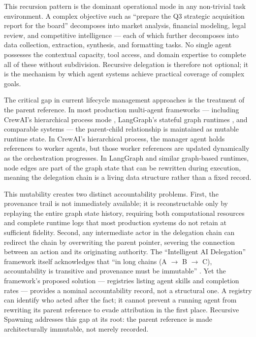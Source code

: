 This recursion pattern is the dominant operational mode in any non-trivial task environment.  A complex objective such as ``prepare the Q3 strategic acquisition report for the board'' decomposes into market analysis, financial modeling, legal review, and competitive intelligence --- each of which further decomposes into data collection, extraction, synthesis, and formatting tasks.  No single agent possesses the contextual capacity, tool access, and domain expertise to complete all of these without subdivision.  Recursive delegation is therefore not optional; it is the mechanism by which agent systems achieve practical coverage of complex goals.

The critical gap in current lifecycle management approaches is the treatment of the parent reference.  In most production multi-agent frameworks --- including CrewAI's hierarchical process mode \cite{zylos2026}, LangGraph's stateful graph runtimes \cite{heavybit2025multiagent}, and comparable systems --- the parent-child relationship is maintained as mutable runtime state.  In CrewAI's hierarchical process, the manager agent holds references to worker agents, but those worker references are updated dynamically as the orchestration progresses.  In LangGraph and similar graph-based runtimes, node edges are part of the graph state that can be rewritten during execution, meaning the delegation chain is a living data structure rather than a fixed record.

This mutability creates two distinct accountability problems.  First, the provenance trail is not immediately available; it is reconstructable only by replaying the entire graph state history, requiring both computational resources and complete runtime logs that most production systems do not retain at sufficient fidelity.  Second, any intermediate actor in the delegation chain can redirect the chain by overwriting the parent pointer, severing the connection between an action and its originating authority.  The ``Intelligent AI Delegation'' framework itself acknowledges that ``in long chains (A $\rightarrow$ B $\rightarrow$ C), accountability is transitive and provenance must be immutable'' \cite[intelligent_ai_delegation]{arxiv2602.11865}.  Yet the framework's proposed solution --- registries listing agent skills and completion rates --- provides a nominal accountability record, not a structural one.  A registry can identify who acted after the fact; it cannot prevent a running agent from rewriting its parent reference to evade attribution in the first place.  Recursive Spawning addresses this gap at its root: the parent reference is made architecturally immutable, not merely recorded.

